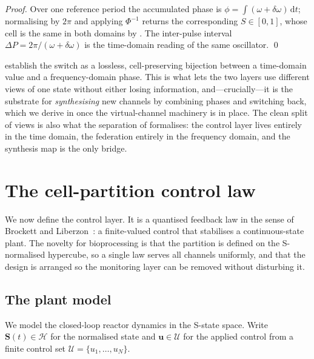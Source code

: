 \documentclass[11pt,a4paper,twocolumn]{article}
\theoremstyle{thmstyle}
\theoremstyle{definition}
\theoremstyle{remark}
\newcommand{\Hs}{\mathcal{H}}
\newcommand{\Us}{\mathcal{U}}
\newcommand{\Ss}{\mathbf{S}}
\newcommand{\DP}{\Delta P}
\begin{document}
\begin{proof}
Over one reference period the accumulated phase is
$\phi=\int(\omega+\delta\omega)\,\mathrm dt$; normalising by $2\pi$ and
applying $\Phi^{-1}$ returns the corresponding $S\in[0,1]$, whose cell is
the same in both domains by . The inter-pulse
interval $\DP=2\pi/(\omega+\delta\omega)$ is the time-domain reading of the
same oscillator. \qed
\end{proof}

 establish the switch
as a lossless, cell-preserving bijection between a time-domain value and a
frequency-domain phase. This is what lets the two layers use different
views of one state without either losing information, and---crucially---it
is the substrate for \emph{synthesising} new channels by combining phases
and switching back, which we derive in  once the
virtual-channel machinery is in place. The clean split of views is also
what the separation of  formalises: the control layer
lives entirely in the time domain, the federation entirely in the
frequency domain, and the synthesis map is the only bridge.

\section{The cell-partition control law}
\label{sec:control}

We now define the control layer. It is a quantised feedback law in the
sense of Brockett and Liberzon~\citep{brockett2000quantized}: a
finite-valued control that stabilises a continuous-state plant. The
novelty for bioprocessing is that the partition is defined on the
S-normalised hypercube, so a single law serves all channels uniformly,
and that the design is arranged so the monitoring layer can be removed
without disturbing it.

\subsection{The plant model}

We model the closed-loop reactor dynamics in the S-state space. Write
$\Ss(t)\in\Hs$ for the normalised state and $\mathbf u\in\Us$ for the
applied control from a finite control set $\Us=\{u_1,\dots,u_N\}$.
\end{document}

